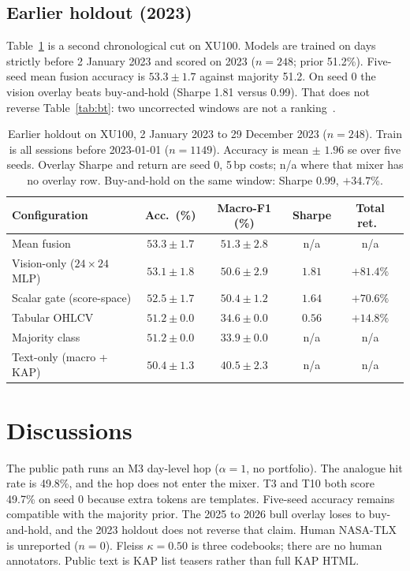 \documentclass{llncs}
\begin{document}
\subsection{Earlier holdout (2023)}
\label{sec:win2}
Table~\ref{tab:win2} is a second chronological cut on XU100. Models are trained on days strictly before 2 January 2023 and scored on 2023 ($n=248$; prior 51.2\%). Five-seed mean fusion accuracy is $53.3\pm1.7$ against majority 51.2. On seed 0 the vision overlay beats buy-and-hold (Sharpe 1.81 versus 0.99). That does not reverse Table~\ref{tab:bt}: two uncorrected windows are not a ranking~\cite{harvey2016and}.

\begin{table}[t]
\caption{Earlier holdout on XU100, 2 January 2023 to 29 December 2023 ($n=248$). Train is all sessions before 2023-01-01 ($n=1149$). Accuracy is mean $\pm$ $1.96$ se over five seeds. Overlay Sharpe and return are seed 0, 5\,bp costs; n/a where that mixer has no overlay row. Buy-and-hold on the same window: Sharpe $0.99$, $+34.7$\%.}
\label{tab:win2}
\centering
\footnotesize
\setlength{\tabcolsep}{3.5pt}
\begin{tabular}{lcccc}
\toprule
Configuration & Acc.\ (\%) & Macro-F1 (\%) & Sharpe & Total ret.\ \\
\midrule
Mean fusion & $53.3\pm1.7$ & $51.3\pm2.8$ & n/a & n/a \\
Vision-only ($24\times24$ MLP) & $53.1\pm1.8$ & $50.6\pm2.9$ & $1.81$ & $+81.4\%$ \\
Scalar gate (score-space) & $52.5\pm1.7$ & $50.4\pm1.2$ & $1.64$ & $+70.6\%$ \\
Tabular OHLCV & $51.2\pm0.0$ & $34.6\pm0.0$ & $0.56$ & $+14.8\%$ \\
Majority class & $51.2\pm0.0$ & $33.9\pm0.0$ & n/a & n/a \\
Text-only (macro + KAP) & $50.4\pm1.3$ & $40.5\pm2.3$ & n/a & n/a \\
\bottomrule
\end{tabular}
\end{table}

\section{Discussions}
The public path runs an M3 day-level hop ($\alpha=1$, no portfolio). The analogue hit rate is 49.8\%, and the hop does not enter the mixer. T3 and T10 both score 49.7\% on seed 0 because extra tokens are templates. Five-seed accuracy remains compatible with the majority prior. The 2025 to 2026 bull overlay loses to buy-and-hold, and the 2023 holdout does not reverse that claim. Human NASA-TLX is unreported ($n=0$). Fleiss $\kappa=0.50$ is three codebooks; there are no human annotators. Public text is KAP list teasers rather than full KAP HTML.
\end{document}
